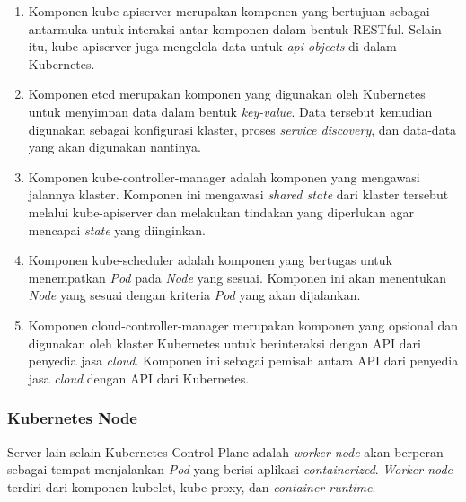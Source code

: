 \begin{enumerate}[itemsep=-0.2cm, topsep=-0.3cm]
  \item{Komponen kube-apiserver merupakan komponen yang
    bertujuan sebagai antarmuka untuk interaksi antar komponen dalam bentuk
    RESTful. Selain itu, kube-apiserver juga mengelola data untuk \emph{api objects}
    di dalam Kubernetes.
  }
  \item{Komponen etcd merupakan komponen yang digunakan
    oleh Kubernetes untuk menyimpan data dalam bentuk \emph{key-value}.
    Data tersebut kemudian digunakan sebagai konfigurasi klaster, proses
    \emph{service discovery}, dan data-data yang akan digunakan nantinya.
  }
  \item{Komponen kube-controller-manager adalah komponen yang
    mengawasi jalannya klaster. Komponen ini mengawasi \emph{shared state} dari
    klaster tersebut melalui kube-apiserver dan melakukan tindakan yang diperlukan
    agar mencapai \emph{state} yang diinginkan.
  }
  \item{Komponen kube-scheduler adalah komponen yang bertugas
    untuk menempatkan \emph{Pod} pada \emph{Node} yang sesuai. Komponen ini
    akan menentukan \emph{Node} yang sesuai dengan kriteria \emph{Pod} yang
    akan dijalankan.
  }
  \item{Komponen cloud-controller-manager merupakan komponen
    yang opsional dan digunakan oleh klaster Kubernetes untuk berinteraksi
    dengan API dari penyedia jasa \emph{cloud}. Komponen ini sebagai pemisah
    antara API dari penyedia jasa \emph{cloud} dengan API dari Kubernetes.
  }
\end{enumerate}

\subsubsection{Kubernetes Node}

Server lain selain Kubernetes Control Plane adalah \emph{worker node}
akan berperan sebagai tempat menjalankan \emph{Pod} yang berisi aplikasi
\emph{containerized}. \emph{Worker node} terdiri dari komponen kubelet, kube-proxy,
dan \emph{container runtime}.

